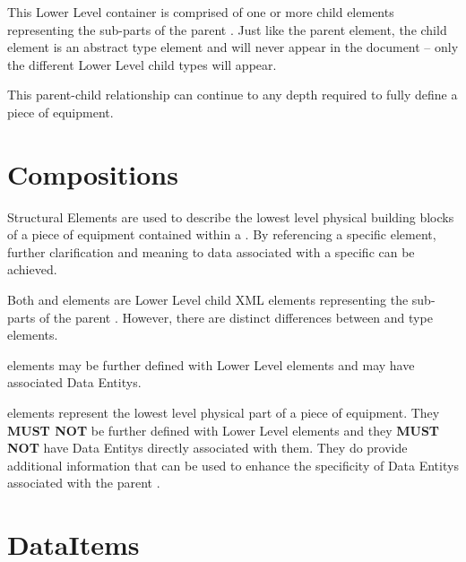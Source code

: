 This \gls{Lower Level}  container is comprised of one or more child  elements representing the sub-parts of the parent . Just like the parent  element, the child  element is an abstract type element and will never appear in the document – only the different \gls{Lower Level} child  types will appear.

This parent-child relationship can continue to any depth required to fully define a piece of equipment.







\section{Compositions}
\label{sec:Compositions}

 \glspl{Structural Element} are used to describe the lowest level physical building blocks of a piece of equipment contained within a . By referencing a specific  element, further clarification and meaning to data associated with a specific  can be achieved.

Both  and  elements are \gls{Lower Level} child  \gls{XML} elements representing the sub-parts of the parent .  However, there are distinct differences between  and  type elements.

 elements may be further defined with \gls{Lower Level}  elements and may have associated \glspl{Data Entity}.

 elements represent the lowest level physical part of a piece of equipment.  They \textbf{MUST NOT} be further defined with \gls{Lower Level}  elements and they \textbf{MUST NOT} have \glspl{Data Entity} directly associated with them.   They do provide additional information that can be used to enhance the specificity of \glspl{Data Entity} associated with the parent .





\section{DataItems}
\label{sec:DataItems}

